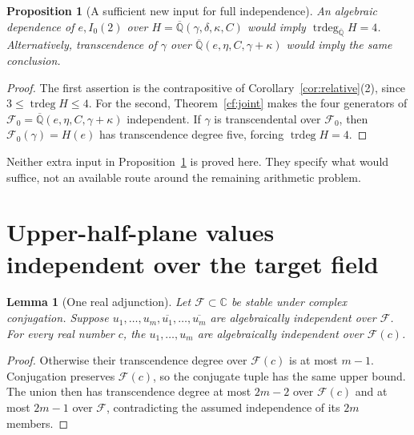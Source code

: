 \documentclass[11pt]{article}
\newtheorem{proposition}[theorem]{Proposition}
\newtheorem{lemma}[theorem]{Lemma}
\theoremstyle{definition}
\theoremstyle{remark}
\newcommand{\Qa}{\overline{\mathbb Q}}
\newcommand{\trdeg}{\operatorname{trdeg}}
\begin{document}
\begin{proposition}[A sufficient new input for full independence]\label{prop:missing}
An algebraic dependence of $e,I_0(2)$ over
$H=\Qa(\gamma,\delta,\kappa,C)$ would imply $\trdeg_{\Qa}H=4$.
Alternatively, transcendence of $\gamma$ over
$\Qa(e,\eta,C,\gamma+\kappa)$ would imply the same conclusion.
\end{proposition}
\begin{proof}
The first assertion is the contrapositive of
Corollary~\ref{cor:relative}(2), since $3\le\trdeg H\le4$.
For the second, Theorem~\ref{cf:joint} makes the four generators of
$\mathcal F_0=\Qa(e,\eta,C,\gamma+\kappa)$ independent. If $\gamma$ is
transcendental over $\mathcal F_0$, then
$\mathcal F_0(\gamma)=H(e)$ has transcendence degree five, forcing
$\trdeg H=4$.
\end{proof}
Neither extra input in Proposition~\ref{prop:missing} is proved here.
They specify what would suffice, not an available route around the
remaining arithmetic problem.



\section{Upper-half-plane values independent over the target field}
\begin{lemma}[One real adjunction]
\label{newupper:real}
Let $\mathcal F\subset\mathbb C$ be stable under complex conjugation.
Suppose $u_1,\ldots,u_m,\overline{u_1},\ldots,\overline{u_m}$
are algebraically independent over $\mathcal F$. For every real number $c$,
the $u_1,\ldots,u_m$ are algebraically independent over $\mathcal F(c)$.
\end{lemma}
\begin{proof}
Otherwise their transcendence degree over $\mathcal F(c)$ is at most $m-1$.
Conjugation preserves $\mathcal F(c)$, so the conjugate tuple has the same
upper bound. The union then has transcendence degree at most
$2m-2$ over $\mathcal F(c)$ and at most $2m-1$ over $\mathcal F$, contradicting the
assumed independence of its $2m$ members.
\end{proof}
\end{document}
